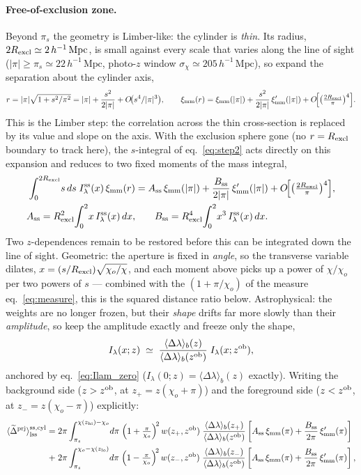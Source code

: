 \documentclass[a4paper, 11pt]{article}
\newcommand{\zob}{z^{\rm ob}}
\newcommand{\ximm}{\xi_{\rm mm}}
\newcommand{\hMpc}{h^{-1}\,\mathrm{Mpc}}
\newcommand{\Rex}{R_{\rm excl}}
\newcommand{\tDp}{\langle \widetilde{\Delta}^{\rm prj}\rangle}
\newcommand{\Ilam}{I_\lambda}
\newcommand{\Ilamss}{I_\lambda^{\rm ss}}
\newcommand{\Dlb}{\langle \Delta\lambda\rangle_b}
\newcommand{\pis}{\pi_s}
\newcommand{\Ass}{A_{\rm ss}}
\newcommand{\Bss}{B_{\rm ss}}
\begin{document}
\paragraph{Free-of-exclusion zone.} Beyond $\pis$ the geometry
is Limber-like: the cylinder is \emph{thin}. Its radius,
$2\Rex\simeq2\,\hMpc$, is small against every scale that varies
along the line of sight ($|\pi|\ge\pis\simeq22\,\hMpc$, photo-$z$
window $\sigma_\chi\simeq205\,\hMpc$), so expand the separation
about the cylinder axis,
\begin{equation}
r = |\pi|\sqrt{1+s^2/\pi^2}
= |\pi| + \frac{s^2}{2|\pi|} + O\!\big(s^4/|\pi|^3\big),
\qquad
\ximm(r) = \ximm(|\pi|)
+ \frac{s^2}{2|\pi|}\,\ximm'(|\pi|)
+ O\!\Big[\big(\tfrac{2\Rex}{\pi}\big)^{4}\Big].
\label{eq:taylor}
\end{equation}
This is the Limber step: the correlation across the thin
cross-section is replaced by its value and slope on the axis.
With the exclusion sphere gone (no $r=\Rex$ boundary to track
here), the $s$-integral of eq.~\eqref{eq:step2} acts directly on
this expansion and reduces to two fixed moments of the mass
integral,
\begin{align}
\int_0^{2\Rex}\! s\,ds\; \Ilamss(x)\,\ximm(r)
&= \Ass\,\ximm(|\pi|)
+ \frac{\Bss}{2|\pi|}\,\ximm'(|\pi|)
+ O\!\Big[\big(\tfrac{2\Rex}{\pi}\big)^{4}\Big],
\notag\\
\Ass = \Rex^2\!\int_0^2\! x\,\Ilamss(x)\,dx,
&\qquad
\Bss = \Rex^4\!\int_0^2\! x^3\,\Ilamss(x)\,dx.
\label{eq:moments}
\end{align}
Two $z$-dependences remain to be restored before this can be
integrated down the line of sight. Geometric: the aperture is
fixed in \emph{angle}, so the transverse variable dilates,
$x=(s/\Rex)\sqrt{\chi_o/\chi}$, and each moment above picks up a
power of $\chi/\chi_o$ per two powers of $s$ --- combined with
the $(1+\pi/\chi_o)$ of the measure eq.~\eqref{eq:measure}, this
is the squared distance ratio below. Astrophysical: the weights
are no longer frozen, but their \emph{shape} drifts far more
slowly than their \emph{amplitude}, so keep the amplitude exactly
and freeze only the shape,
\begin{equation}
\Ilam(x;z) \;\simeq\;
\frac{\Dlb(z)}{\Dlb(\zob)}\; \Ilam(x;\zob),
\label{eq:amp_drift}
\end{equation}
anchored by eq.~\eqref{eq:Ilam_zero}
($\Ilam(0;z)=\Dlb(z)$ exactly). Writing the background side
($z>\zob$, at $z_+ = z(\chi_o+\pi)$) and the foreground side
($z<\zob$, at $z_- = z(\chi_o-\pi)$) explicitly:
\begin{align}
\tDp^{\rm ss,cyl}_{\rm lss}
=\;& 2\pi\int_{\pis}^{\chi(z_{\rm hi})-\chi_o}\! d\pi\;
\Big(1+\tfrac{\pi}{\chi_o}\Big)^{\!2}\,
w(z_+,\zob)\;
\frac{\Dlb(z_+)}{\Dlb(\zob)}
\left[ \Ass\,\ximm(\pi)
+ \frac{\Bss}{2\pi}\,\ximm'(\pi)\right]
\notag\\
+\;& 2\pi\int_{\pis}^{\chi_o-\chi(z_{\rm lo})}\! d\pi\;
\Big(1-\tfrac{\pi}{\chi_o}\Big)^{\!2}\,
w(z_-,\zob)\;
\frac{\Dlb(z_-)}{\Dlb(\zob)}
\left[ \Ass\,\ximm(\pi)
+ \frac{\Bss}{2\pi}\,\ximm'(\pi)\right],
\label{eq:cyl}
\end{align}
\end{document}
